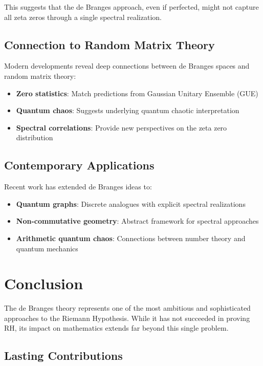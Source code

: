 This suggests that the de Branges approach, even if perfected, might not capture all zeta zeros through a single spectral realization.

\subsection{Connection to Random Matrix Theory}

Modern developments reveal deep connections between de Branges spaces and random matrix theory:

\begin{itemize}
\item \textbf{Zero statistics}: Match predictions from Gaussian Unitary Ensemble (GUE)
\item \textbf{Quantum chaos}: Suggests underlying quantum chaotic interpretation
\item \textbf{Spectral correlations}: Provide new perspectives on the zeta zero distribution
\end{itemize}

\subsection{Contemporary Applications}

Recent work has extended de Branges ideas to:

\begin{itemize}
\item \textbf{Quantum graphs}: Discrete analogues with explicit spectral realizations
\item \textbf{Non-commutative geometry}: Abstract framework for spectral approaches
\item \textbf{Arithmetic quantum chaos}: Connections between number theory and quantum mechanics
\end{itemize}

\section{Conclusion}
\label{sec:debranges-conclusion}

The de Branges theory represents one of the most ambitious and sophisticated approaches to the Riemann Hypothesis. While it has not succeeded in proving RH, its impact on mathematics extends far beyond this single problem.

\subsection{Lasting Contributions}


